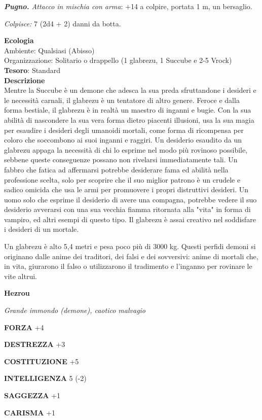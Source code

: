 \begin{multicols}{2}
	\textit{\textbf{Pugno.} Attacco in mischia con arma}: +14 a colpire, portata 1 m, un bersaglio.

	\textit{Colpisce:} 7 (2d4 + 2) danni da botta.

	\textbf{Ecologia}\\
	Ambiente: Qualsiasi (Abisso)\\
	Organizzazione: Solitario o drappello (1 glabrezu, 1 Succube e 2-5 Vrock)
	\textbf{Tesoro}: Standard\\
	\textbf{Descrizione}\\
	Mentre la Succube è un demone che adesca la sua preda sfruttandone i desideri e le necessità carnali, il glabrezu è un tentatore di altro genere. Feroce e dalla forma bestiale, il glabrezu è in realtà un maestro di inganni e bugie. Con la sua abilità di nascondere la sua vera forma dietro piacenti illusioni, usa la sua magia per esaudire i desideri degli umanoidi mortali, come forma di ricompensa per coloro che soccombono ai suoi inganni e raggiri. Un desiderio esaudito da un glabrezu appaga la necessità di chi lo esprime nel modo più rovinoso possibile, sebbene queste conseguenze possano non rivelarsi immediatamente tali. Un fabbro che fatica ad affermarsi potrebbe desiderare fama ed abilità nella professione scelta, solo per scoprire che il suo miglior patrono è un crudele e sadico omicida che usa le armi per promuovere i propri distruttivi desideri. Un uomo solo che esprime il desiderio di avere una compagna, potrebbe vedere il suo desiderio avverarsi con una sua vecchia fiamma ritornata alla "vita" in forma di vampiro, ed altri esempi di questo tipo. Il glabrezu è assai creativo nel soddisfare i desideri di un mortale.

	Un glabrezu è alto 5,4 metri e pesa poco più di 3000 kg. Questi perfidi demoni si originano dalle anime dei traditori, dei falsi e dei sovversivi: anime di mortali che, in vita, giurarono il falso o utilizzarono il tradimento e l'inganno per rovinare le vite altrui.

	\medskip{}\textbf{Hezrou}

	\textit{Grande immondo (demone), caotico malvagio}

	\textbf{FORZA} +4

	\textbf{DESTREZZA} +3

	\textbf{COSTITUZIONE} +5

	\textbf{INTELLIGENZA} 5 (-2)

	\textbf{SAGGEZZA} +1

	\textbf{CARISMA} +1


\end{multicols}
